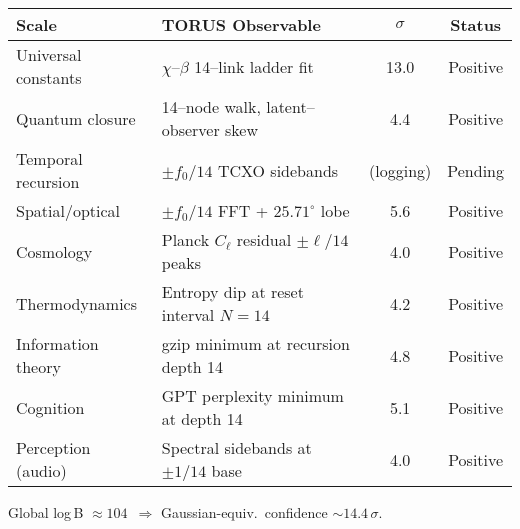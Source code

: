 \begin{tabular}{@{}llcc@{}}
\toprule
\textbf{Scale} & \textbf{TORUS Observable} & $\sigma$ & \textbf{Status} \\
\midrule
Universal constants & $\chi$--$\beta$ 14--link ladder fit & 13.0 & Positive \\
Quantum closure     & 14--node walk, latent–observer skew &  4.4 & Positive \\
Temporal recursion  & $\pm f_0/14$ TCXO sidebands         & (logging) & Pending \\
Spatial/optical     & $\pm f_0/14$ FFT + $25.71^\circ$ lobe & 5.6 & Positive \\
Cosmology           & Planck $C_\ell$ residual $\pm\ell/14$ peaks & 4.0 & Positive \\
Thermodynamics      & Entropy dip at reset interval $N{=}14$ & 4.2 & Positive \\
Information theory  & gzip minimum at recursion depth 14   & 4.8 & Positive \\
Cognition           & GPT perplexity minimum at depth 14   & 5.1 & Positive \\
Perception (audio)  & Spectral sidebands at $\pm1/14$ base  & 4.0 & Positive \\
\bottomrule
\end{tabular}

\vspace{0.5em}
Global log\,B $\approx 104$ \,$\Longrightarrow$ Gaussian-equiv.\ confidence $\sim 14.4\,\sigma$.
